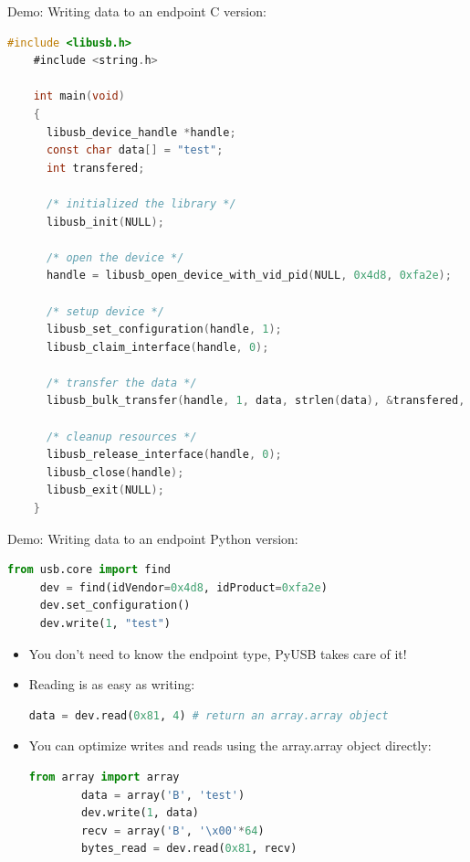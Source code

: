 \documentclass[pdf]{beamer}
\begin{document}
\begin{frame}[fragile]{Demo: Writing data to an endpoint}
  \tiny
  \pause
  C version:
  \pause
  \begin{lstlisting}[language=C]
    #include <libusb.h>
    #include <string.h>

    int main(void)
    {
      libusb_device_handle *handle;
      const char data[] = "test";
      int transfered;

      /* initialized the library */
      libusb_init(NULL);

      /* open the device */
      handle = libusb_open_device_with_vid_pid(NULL, 0x4d8, 0xfa2e);

      /* setup device */
      libusb_set_configuration(handle, 1);
      libusb_claim_interface(handle, 0);

      /* transfer the data */
      libusb_bulk_transfer(handle, 1, data, strlen(data), &transfered, 1000);

      /* cleanup resources */
      libusb_release_interface(handle, 0);
      libusb_close(handle);
      libusb_exit(NULL);
    }
  \end{lstlisting}
\end{frame}

\begin{frame}[fragile]{Demo: Writing data to an endpoint}
  \tiny
  \pause
  Python version:
  \pause
  \begin{lstlisting}[language=Python]
     from usb.core import find
     dev = find(idVendor=0x4d8, idProduct=0xfa2e)
     dev.set_configuration()
     dev.write(1, "test")
  \end{lstlisting}

  \begin{itemize}
    \tiny
    \pause
    \item You don't need to know the endpoint type, PyUSB takes care of it!
    \pause
    \item Reading is as easy as writing:
    \begin{lstlisting}[language=Python]
      data = dev.read(0x81, 4) # return an array.array object
    \end{lstlisting}
    \pause
    \item You can optimize writes and reads using the array.array object directly:
      \begin{lstlisting}[language=Python]
        from array import array
        data = array('B', 'test')
        dev.write(1, data)
        recv = array('B', '\x00'*64)
        bytes_read = dev.read(0x81, recv)
      \end{lstlisting}
  \end{itemize}
\end{frame}
\end{document}
